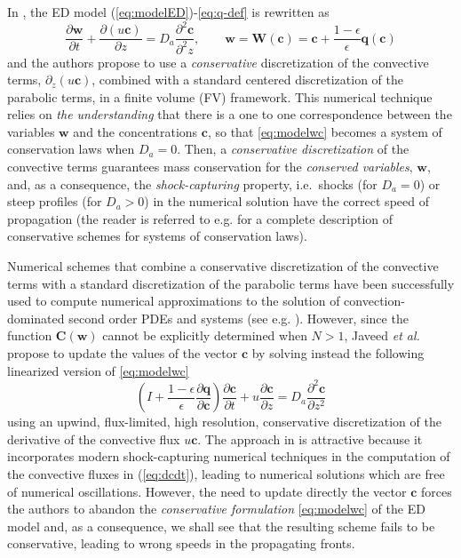 \documentclass[preprint]{elsarticle}
\theoremstyle{definition}
\newcommand{\bbc}{{\boldsymbol c}}
\newcommand{\bw}{\boldsymbol w}
\newcommand{\bW}{\boldsymbol W}
\newcommand{\bc}{\boldsymbol c}
\newcommand{\bC}{\boldsymbol C}
\newcommand{\bq}{\boldsymbol q}
\begin{document}
 In \cite{Javeed}, the ED model
(\ref{eq:modelED})-\eqref{eq:q-def} is rewritten as 
\begin{equation} \label{eq:modelwc}
 \frac{\partial \bw}{\partial t} + \frac{\partial (u\bc)}{\partial z}= 
D_a \frac{\partial^2 \bc}{\partial^2 z}, \qquad
\bw=\bW(\bc)=\bc+\frac{1-\epsilon}{\epsilon} \bq(\bc)
\end{equation}
and the authors propose to use a {\em conservative} 
discretization of the convective terms, $\partial_z (u\bc)$, combined
with  a standard
  centered discretization of the parabolic terms,  in a finite volume
  (FV) framework.
This numerical technique  relies on {\em the
  understanding} 
that there is a one to one correspondence between the  
variables $\bw$ and the concentrations $\bc$, so that
  \eqref{eq:modelwc} becomes a system of conservation laws   when $D_a=0$. Then,
a {\em conservative
    discretization} of 
  the convective terms  guarantees mass conservation  for the
  {\em conserved    variables}, $\bw$, and, as a
  consequence, the  {\em 
    shock-capturing} property, i.e.~shocks (for $D_a=0$) or steep profiles (for
  $D_a>0$) in the numerical solution have the correct speed of
  propagation (the reader is referred to e.g. \cite{Levequeb} for a
  complete description of conservative schemes for systems of
  conservation laws).  

Numerical schemes that combine a conservative discretization of the
convective terms with a standard discretization of the parabolic terms
  have been successfully used to compute numerical approximations to
  the solution of convection-dominated second order PDEs and systems
  (see e.g. \cite{Donat1,BMV13,BBMRV15}).
   However, since  the
function  $\bC(\bw)$  cannot be explicitly determined  when $N>1$, 
  Javeed {\em et al.}
propose to update the values of the vector $\bbc$ by solving instead
the following linearized version of \eqref{eq:modelwc}
\begin{equation} \label{eq:dcdt}
(I+\frac{1-\epsilon}{\epsilon} \frac{\partial \bq}{\partial \bc})
\frac{\partial \bc}{\partial t} + 
u \frac{\partial \bc}{\partial z} = D_a \frac{\partial^2 \bc}{\partial
  z^2}
\end{equation}
 using an upwind, flux-limited, high resolution, conservative discretization
of the derivative of the convective flux $u \bc$. The approach
in \cite{Javeed} is  attractive because it
 incorporates 
 modern shock-capturing numerical techniques in the computation of
 the convective fluxes in (\ref{eq:dcdt}), leading to numerical
 solutions which are free of numerical oscillations. However, the need to update directly
 the vector $\bc$ forces the authors to abandon the {\em conservative
   formulation } \eqref{eq:modelwc}
 of the ED model and, as a consequence, we shall see that the resulting
scheme fails to be conservative,  leading to wrong speeds
in the propagating fronts. 
\end{document}

